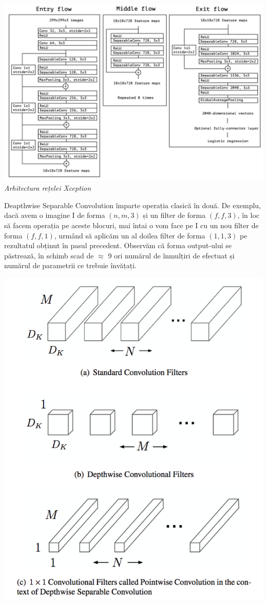 \begin{center}
\includegraphics[scale=0.3]{xception}
\textit{Arhitectura rețelei Xception}
\end{center}

Deapthwise Separable Convolution împarte operația clasică în două. De exemplu, dacă avem o imagine I de forma $(n,m,3)$ și un filter de forma $(f,f,3)$, în loc să facem operația pe aceste blocuri, mai întai o vom face pe I cu un nou filter de forma $(f,f,1)$, urmând să aplicăm un al doilea filter de forma $(1,1,3)$ pe rezultatul obținut în pasul precedent. Observăm că forma output-ului se păstrează, în schimb scad de $\approx$ 9 ori numărul de înmulțiri de efectuat și numărul de parametrii ce trebuie învățați.

\begin{center}
\includegraphics[scale=0.4]{depthconv}
\end{center}

